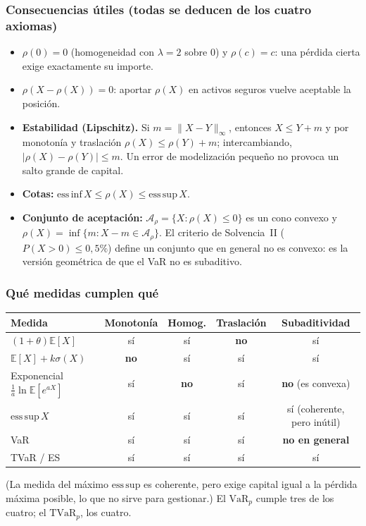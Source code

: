 \documentclass[a4paper,12pt]{article}
\newcommand{\E}{\mathbb{E}}
\newcommand{\VaR}{\mathrm{VaR}}
\newcommand{\TVaR}{\mathrm{TVaR}}
\begin{document}
\subsubsection*{Consecuencias \'utiles (todas se deducen de los cuatro axiomas)}
\begin{itemize}[leftmargin=*,itemsep=2pt]
\item $\rho(0)=0$ (homogeneidad con $\lambda=2$ sobre $0$) y $\rho(c)=c$: una p\'erdida cierta exige exactamente su importe.
\item $\rho(X-\rho(X))=0$: aportar $\rho(X)$ en activos seguros vuelve aceptable la posici\'on.
\item \textbf{Estabilidad (Lipschitz).} Si $m=\|X-Y\|_\infty$, entonces $X\le Y+m$ y por monoton\'ia y traslaci\'on $\rho(X)\le\rho(Y)+m$; intercambiando, $|\rho(X)-\rho(Y)|\le m$. Un error de modelizaci\'on peque\~no no provoca un salto grande de capital.
\item \textbf{Cotas:} $\mathrm{ess\,inf}\,X\le\rho(X)\le\mathrm{ess\,sup}\,X$.
\item \textbf{Conjunto de aceptaci\'on:} $\mathcal A_\rho=\{X:\rho(X)\le0\}$ es un cono convexo y $\rho(X)=\inf\{m:X-m\in\mathcal A_\rho\}$. El criterio de Solvencia~II ($P(X>0)\le0{,}5\%$) define un conjunto que en general no es convexo: es la versi\'on geom\'etrica de que el VaR no es subaditivo.
\end{itemize}

\subsubsection*{Qu\'e medidas cumplen qu\'e}
\begin{center}
\small
\begin{tabular}{lcccc}
\toprule
Medida & Monoton\'ia & Homog. & Traslaci\'on & Subaditividad\\
\midrule
$(1+\theta)\E[X]$ & s\'i & s\'i & \textbf{no} & s\'i\\
$\E[X]+k\sigma(X)$ & \textbf{no} & s\'i & s\'i & s\'i\\
Exponencial $\frac1a\ln\E[e^{aX}]$ & s\'i & \textbf{no} & s\'i & \textbf{no} (es convexa)\\
$\mathrm{ess\,sup}\,X$ & s\'i & s\'i & s\'i & s\'i (coherente, pero in\'util)\\
VaR & s\'i & s\'i & s\'i & \textbf{no en general}\\
TVaR / ES & s\'i & s\'i & s\'i & s\'i\\
\bottomrule
\end{tabular}
\end{center}
(La medida del m\'aximo $\mathrm{ess\,sup}$ es coherente, pero exige capital igual a la p\'erdida m\'axima posible, lo que no sirve para gestionar.) El $\VaR_p$ cumple tres de los cuatro; el $\TVaR_p$, los cuatro.
\end{document}
